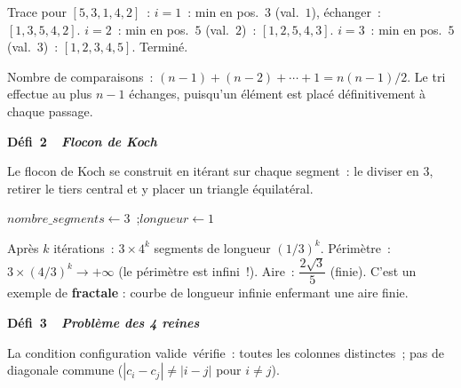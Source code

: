 Trace pour $[5,3,1,4,2]$~:
$i=1$~: min en pos.~$3$ (val.~$1$), \'echanger~: $[1,3,5,4,2]$.
$i=2$~: min en pos.~$5$ (val.~$2$)~: $[1,2,5,4,3]$.
$i=3$~: min en pos.~$5$ (val.~$3$)~: $[1,2,3,4,5]$. Termin\'e.

Nombre de comparaisons~: $(n-1)+(n-2)+\cdots+1=n(n-1)/2$.
Le tri effectue au plus $n-1$ échanges, puisqu'un élément est placé définitivement
à chaque passage.

\noindent{}
{\color{BO}\bfseries\small D\'efi~2~\textendash\ \textit{Flocon de Koch}}
\par\smallskip

Le flocon de Koch se construit en it\'erant sur chaque segment~:
le diviser en $3$, retirer le tiers central et y placer un triangle \'equilat\'eral.

\begin{algorithm}[H]
\caption{Flocon de Koch (simulation)}
$\mathit{nombre\_segments} \leftarrow 3$~;\quad $\mathit{longueur} \leftarrow 1$\;
\end{algorithm}

Apr\`es $k$ it\'erations~: $3\times4^k$ segments de longueur $(1/3)^k$.
P\'erim\`etre~: $3\times(4/3)^k\to+\infty$ (le p\'erim\`etre est infini~!).
Aire~: $\dfrac{2\sqrt{3}}{5}$ (finie).
C'est un exemple de \textbf{fractale} : courbe de longueur infinie enfermant une aire finie.

\noindent{}
{\color{BO}\bfseries\small D\'efi~3~\textendash\ \textit{Probl\`eme des 4 reines}}
\par\smallskip

\begin{algorithm}[H]
\caption{4 reines par force brute}
\end{algorithm}

La condition \og configuration valide\fg\ v\'erifie~:
toutes les colonnes distinctes~; pas de diagonale commune
($|c_i-c_j|\ne|i-j|$ pour $i\ne j$).

